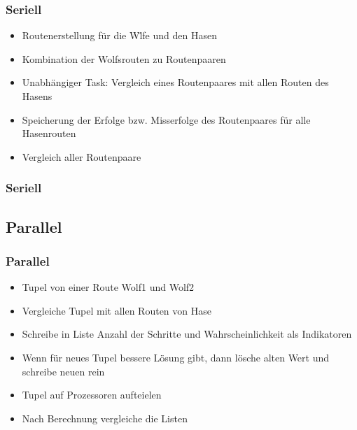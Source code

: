 \documentclass{beamer}
\begin{document}
\begin{frame}
\frametitle{Seriell}
\begin{itemize}
\item Routenerstellung für die W\"lfe und den Hasen
\item Kombination der Wolfsrouten zu Routenpaaren
\item Unabh\"angiger Task: Vergleich eines Routenpaares mit allen Routen des Hasens
\item Speicherung der Erfolge bzw. Misserfolge des Routenpaares für alle Hasenrouten
\item Vergleich aller Routenpaare
\end{itemize}
\end{frame}



\begin{frame}
\begin{algorithm}[H]
\frametitle{Seriell}
 {
 }
\end{algorithm}
\end{frame}

\subsection{Parallel}
\begin{frame}
\frametitle{Parallel}
\begin{itemize}
\item Tupel von einer Route Wolf1 und Wolf2
\item Vergleiche Tupel mit allen Routen von Hase
\item Schreibe in Liste Anzahl der Schritte und Wahrscheinlichkeit als Indikatoren
\item Wenn f\"ur neues Tupel bessere L\"osung gibt, dann l\"osche alten Wert und schreibe neuen rein

\item Tupel auf Prozessoren aufteielen
\item Nach Berechnung vergleiche die Listen
\end{itemize}
\end{frame}
\end{document}
